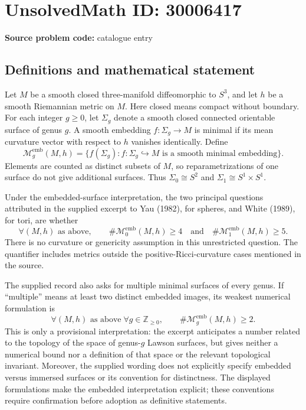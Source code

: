 \documentclass[11pt]{article}
\newcommand{\Z}{\mathbb{Z}}
\begin{document}
\section*{UnsolvedMath ID: 30006417}
\textbf{Source problem code:} catalogue entry
\subsection{Definitions and mathematical statement}
Let \(M\) be a smooth closed three-manifold diffeomorphic to \(S^3\), and let \(h\) be a smooth Riemannian metric on \(M\). Here closed means compact without boundary. For each integer \(g\geq 0\), let \(\Sigma_g\) denote a smooth closed connected orientable surface of genus \(g\). A smooth embedding \(f:\Sigma_g\to M\) is minimal if its mean curvature vector with respect to \(h\) vanishes identically. Define
\[
\mathcal M_g^{\mathrm{emb}}(M,h)
=\bigl\{f(\Sigma_g): f:\Sigma_g\hookrightarrow M
\text{ is a smooth minimal embedding}\bigr\}.
\]
Elements are counted as distinct subsets of \(M\), so reparametrizations of one surface do not give additional surfaces. Thus \(\Sigma_0\cong S^2\) and \(\Sigma_1\cong S^1\times S^1\).

Under the embedded-surface interpretation, the two principal questions attributed in the supplied excerpt to Yau (1982), for spheres, and White (1989), for tori, are whether
\[
\forall (M,h)\text{ as above},\qquad
\#\mathcal M_0^{\mathrm{emb}}(M,h)\geq 4
\quad\text{and}\quad
\#\mathcal M_1^{\mathrm{emb}}(M,h)\geq 5.
\]
There is no curvature or genericity assumption in this unrestricted question. The quantifier includes metrics outside the positive-Ricci-curvature cases mentioned in the source.

The supplied record also asks for multiple minimal surfaces of every genus. If ``multiple'' means at least two distinct embedded images, its weakest numerical formulation is
\[
\forall (M,h)\text{ as above}\;\forall g\in\Z_{\geq0},
\qquad \#\mathcal M_g^{\mathrm{emb}}(M,h)\geq 2.
\]
This is only a provisional interpretation: the excerpt anticipates a number related to the topology of the space of genus-\(g\) Lawson surfaces, but gives neither a numerical bound nor a definition of that space or the relevant topological invariant. Moreover, the supplied wording does not explicitly specify embedded versus immersed surfaces or its convention for distinctness. The displayed formulations make the embedded interpretation explicit; these conventions require confirmation before adoption as definitive statements.
\end{document}
